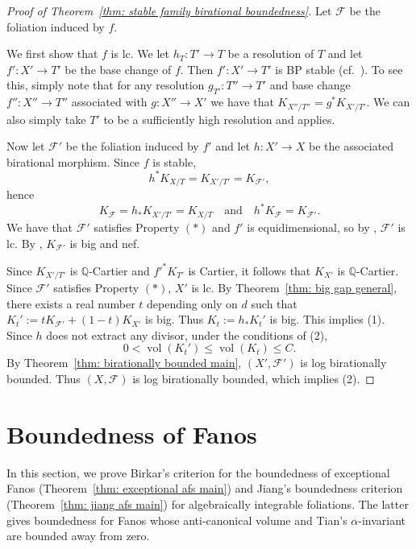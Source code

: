 \documentclass[11pt,reqno]{amsart}
\numberwithin{equation}{section}
\newcommand{\vol}{\operatorname{vol}}
\newcommand{\Ff}{\mathcal{F}}
\theoremstyle{definition}
\begin{document}
\begin{proof}[Proof of Theorem~\ref{thm: stable family birational boundedness}]
Let $\Ff$ be the foliation induced by $f$. 

We first show that $f$ is lc. We let $h_T: T'\rightarrow T$ be a resolution of $T$ and let $f': X'\rightarrow T'$ be the base change of $f$. Then $f': X'\rightarrow T'$ is BP stable (cf.~\cite[Definition~2.5]{ACSS21}). To see this, simply note that for any resolution $g_{T'}: T''\rightarrow T'$ and base change $f'': X''\rightarrow T''$ associated with $g: X''\rightarrow X'$ we have that $K_{X''/T''}=g^*K_{X'/T'}$. We can also simply take $T'$ to be a sufficiently high resolution and \cite[Theorem~1]{Sho23} applies.

Now let $\Ff'$ be the foliation induced by $f'$ and let $h: X'\rightarrow X$ be the associated birational morphism. Since $f$ is stable, 
$$h^*K_{X/T}=K_{X'/T'}=K_{\Ff'},$$
hence
$$K_{\Ff}=h_*K_{X'/T'}=K_{X/T}\quad \text{and}\quad h^*K_{\Ff}=K_{\Ff'}.$$
We have that $\Ff'$ satisfies Property $(*)$ and $f'$ is equidimensional, so by \cite[Proposition~3.7]{ACSS21}, $\Ff'$ is lc. By \cite[Proposition~2.15]{PX17}, $K_{\Ff'}$ is big and nef.

Since $K_{X'/T'}$ is $\mathbb Q$-Cartier and $f'^*K_{T'}$ is Cartier, it follows that $K_{X'}$ is $\mathbb Q$-Cartier. Since $\Ff'$ satisfies Property $(*)$, $X'$ is lc. By Theorem~\ref{thm: big gap general}, there exists a real number $t$ depending only on $d$ such that $K_{t}':=tK_{\Ff'}+(1-t)K_{X'}$ is big. Thus $K_t:=h_*K_t'$ is big. This implies (1). Since $h$ does not extract any divisor, under the conditions of (2),
$$0<\vol(K_t')\leq\vol(K_t)\leq C.$$
By Theorem~\ref{thm: birationally bounded main}, $(X',\Ff')$ is log birationally bounded. Thus $(X,\Ff)$ is log birationally bounded, which implies (2).
\end{proof}


\section{Boundedness of Fanos}\label{sec: application}

In this section, we prove Birkar's criterion for the boundedness of exceptional Fanos (Theorem~\ref{thm: exceptional afs main}) and Jiang's boundedness criterion (Theorem~\ref{thm: jiang afs main}) for algebraically integrable foliations. The latter gives boundedness for Fanos whose anti-canonical volume and Tian's $\alpha$-invariant are bounded away from zero.
\end{document}
